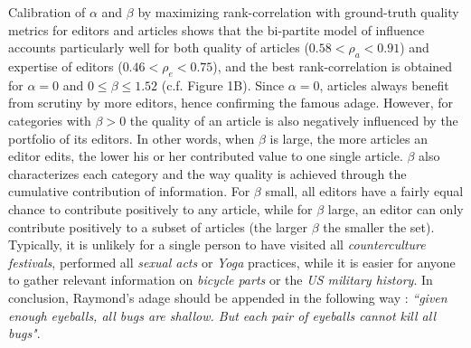 \documentclass[letterpaper,9pt,a4paper]{article}
\begin{document}
Calibration of $\alpha$ and $\beta$ by maximizing rank-correlation with ground-truth quality metrics for editors \cite{geiger2013} and articles \cite{wang} shows that the bi-partite model of influence accounts particularly well for both quality of articles ($0.58 < \rho_a < 0.91$) and expertise of editors ($0.46 < \rho_e < 0.75 $), and the best rank-correlation is obtained for $\alpha= 0$ and $0 \leqslant \beta \leqslant 1.52$ (c.f. Figure 1B). Since $\alpha = 0$, articles always benefit from scrutiny by more editors, hence confirming the famous adage. However, for categories with $\beta >0$ the quality of an article is also negatively influenced by the portfolio of its editors. In other words, when $\beta$ is large, the more articles an editor edits, the lower his or her contributed value to one single article. $\beta$ also characterizes each category and the way quality is achieved through the cumulative contribution of information. For $\beta$ small, all editors have a fairly equal chance to contribute positively to any article, while for $\beta$ large, an editor can only contribute positively to a subset of articles (the larger $\beta$ the smaller the set). Typically, it is unlikely for a single person to have visited all {\it counterculture festivals}, performed all {\it sexual acts} or {\it Yoga} practices, while it is easier for anyone to gather relevant information on {\it bicycle parts} or the {\it US military history}. In conclusion, Raymond's adage should be appended in the following way : {\it ``given enough eyeballs, all bugs are shallow. But each pair of eyeballs cannot kill all bugs"}.
\end{document}

